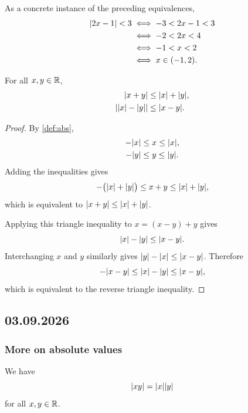 \documentclass[11pt,a4paper]{amsart}
\begin{document}
\begin{example}
  As a concrete instance of the preceding equivalences,
  \begin{align*}
    \lvert2x-1\rvert<3
    &\iff -3<2x-1<3 \\
    &\iff -2<2x<4 \\
    &\iff -1<x<2 \\
    &\iff x\in(-1,2).
  \end{align*}
\end{example}

\begin{theorem}
  For all \(x,y\in\mathbb{R}\),
  \begin{align*}
    \lvert x+y\rvert &\leq \lvert x\rvert+\lvert y\rvert, \\
    \lvert\lvert x\rvert-\lvert y\rvert\rvert &\leq \lvert x-y\rvert.
  \end{align*}
\end{theorem}

\begin{proof}
  By \cref{def:abs},
  \begin{align*}
    -\lvert x\rvert&\leq x\leq\lvert x\rvert, \\
    -\lvert y\rvert&\leq y\leq\lvert y\rvert.
  \end{align*}
  Adding the inequalities gives
  \[
    -\bigl(\lvert x\rvert+\lvert y\rvert\bigr)
    \leq x+y
    \leq \lvert x\rvert+\lvert y\rvert,
  \]
  which is equivalent to \(\lvert x+y\rvert\leq\lvert x\rvert+\lvert y\rvert\).

  Applying this triangle inequality to \(x=(x-y)+y\) gives
  \[
    \lvert x\rvert-\lvert y\rvert\leq\lvert x-y\rvert.
  \]
  Interchanging \(x\) and \(y\) similarly gives
  \(\lvert y\rvert-\lvert x\rvert\leq\lvert x-y\rvert\). Therefore
  \[
    -\lvert x-y\rvert\leq\lvert x\rvert-\lvert y\rvert\leq\lvert x-y\rvert,
  \]
  which is equivalent to the reverse triangle inequality.
\end{proof}

\subsection{03.09.2026}

\subsubsection{More on absolute values}

\begin{theorem}
  We have
  \[
    \lvert xy\rvert = \lvert x\rvert\lvert y\rvert
  \]
  for all \(x, y \in \mathbb{R}\).
\end{theorem}
\end{document}

